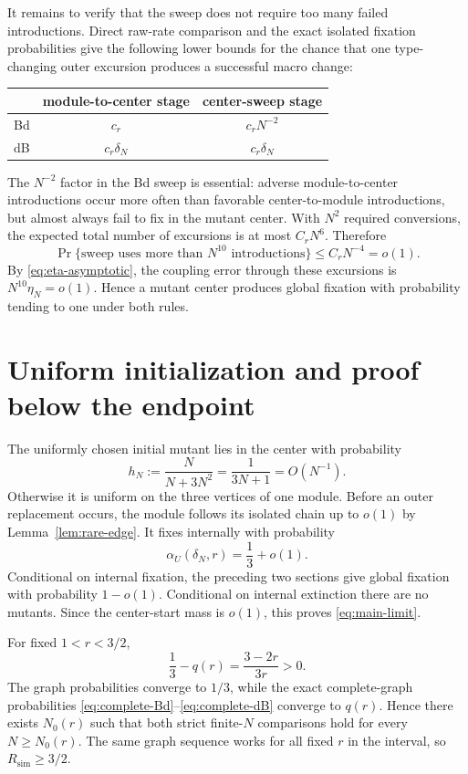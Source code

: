 \documentclass[11pt]{article}
\theoremstyle{definition}
\theoremstyle{remark}
\begin{document}
It remains to verify that the sweep does not require too many failed
introductions.  Direct raw-rate comparison and the exact isolated fixation
probabilities give the following lower bounds for the chance that one
type-changing outer excursion produces a successful macro change:
\begin{center}
\begin{tabular}{lcc}
\toprule
 & module-to-center stage & center-sweep stage\\
\midrule
Bd & $c_r$ & $c_rN^{-2}$\\
dB & $c_r\delta_N$ & $c_r\delta_N$\\
\bottomrule
\end{tabular}
\end{center}
The $N^{-2}$ factor in the Bd sweep is essential: adverse
module-to-center introductions occur more often than favorable
center-to-module introductions, but almost always fail to fix in the mutant
center.  With $N^2$ required conversions, the expected total number of
excursions is at most $C_rN^6$.  Therefore
\begin{equation}
 \Pr\{\text{sweep uses more than }N^{10}\text{ introductions}\}
 \leq C_rN^{-4}=o(1).
 \label{eq:sweep-tail}
\end{equation}
By \eqref{eq:eta-asymptotic}, the coupling error through these excursions is
$N^{10}\eta_N=o(1)$.  Hence a mutant center produces global fixation with
probability tending to one under both rules.

\section{Uniform initialization and proof below the endpoint}

The uniformly chosen initial mutant lies in the center with probability
\begin{equation}
 h_N:=\frac{N}{N+3N^2}=\frac1{3N+1}=O(N^{-1}).
 \label{eq:center-mass}
\end{equation}
Otherwise it is uniform on the three vertices of one module.  Before an outer
replacement occurs, the module follows its isolated chain up to $o(1)$ by
Lemma~\ref{lem:rare-edge}.  It fixes internally with probability
\[
 \alpha_U(\delta_N,r)=\frac13+o(1).
\]
Conditional on internal fixation, the preceding two sections give global
fixation with probability $1-o(1)$.  Conditional on internal extinction there
are no mutants.  Since the center-start mass is $o(1)$, this proves
\eqref{eq:main-limit}.

For fixed $1<r<3/2$,
\begin{equation}
 \frac13-q(r)=\frac{3-2r}{3r}>0.
 \label{eq:positive-gap}
\end{equation}
The graph probabilities converge to $1/3$, while the exact complete-graph
probabilities \eqref{eq:complete-Bd}--\eqref{eq:complete-dB} converge to
$q(r)$.  Hence there exists $N_0(r)$ such that both strict finite-$N$
comparisons hold for every $N\geq N_0(r)$.  The same graph sequence works for
all fixed $r$ in the interval, so $R_{\mathrm{sim}}\geq3/2$.
\end{document}
